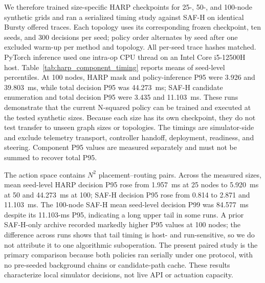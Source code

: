 \documentclass[final,5p]{elsarticle}
\newcommand{\rev}[1]{\textcolor{revisiongreen}{#1}}
\let\newrev\rev
\begin{document}
\newrev{We therefore trained size-specific HARP checkpoints for 25-, 50-, and 100-node synthetic grids and ran a serialized timing study against SAF-H on identical Bursty offered traces. Each topology uses its corresponding frozen checkpoint, ten seeds, and 300 decisions per seed; policy order alternates by seed after one excluded warm-up per method and topology. All per-seed trace hashes matched. PyTorch inference used one intra-op CPU thread on an Intel Core i5-12500H host. Table~\ref{tab:harp_component_timing} reports means of seed-level percentiles. At 100 nodes, HARP mask and policy-inference P95 were 3.926 and 39.803~ms, while total decision P95 was 44.273~ms; SAF-H candidate enumeration and total decision P95 were 3.435 and 11.103~ms. These runs demonstrate that the current N-squared policy can be trained and executed at the tested synthetic sizes. Because each size has its own checkpoint, they do not test transfer to unseen graph sizes or topologies. The timings are simulator-side and exclude telemetry transport, controller handoff, deployment, readiness, and steering. Component P95 values are measured separately and must not be summed to recover total P95.}
\begin{table}[t]
\centering
\caption{Matched simulator timing in synthetic Bursty runs (ms; mean of ten seed-level percentiles, 300 decisions per seed).}
\label{tab:harp_component_timing}
\scriptsize
{}
\end{table}

\newrev{The action space contains $N^2$ placement--routing pairs. Across the measured sizes, mean seed-level HARP decision P95 rose from 1.957~ms at 25 nodes to 5.920~ms at 50 and 44.273~ms at 100; SAF-H decision P95 rose from 0.814 to 2.871 and 11.103~ms. The 100-node SAF-H mean seed-level decision P99 was 84.577~ms despite its 11.103-ms P95, indicating a long upper tail in some runs. A prior SAF-H-only archive recorded markedly higher P95 values at 100 nodes; the difference across runs shows that tail timing is host- and run-sensitive, so we do not attribute it to one algorithmic suboperation. The present paired study is the primary comparison because both policies ran serially under one protocol, with no pre-seeded background chains or candidate-path cache. These results characterize local simulator decisions, not live API or actuation capacity.}
\end{document}
